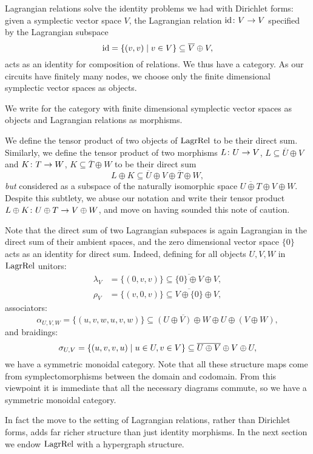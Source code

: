 Lagrangian relations solve the identity problems we had with Dirichlet forms:
given a symplectic vector space $V$, the Lagrangian relation $\mathrm{id}{\colon} V \to V$
specified by the Lagrangian subspace
\[
  \mathrm{id} = \{(v,v) \mid v \in V\} \subseteq \overline{V} \oplus V,
\]
acts as an identity for composition of relations. We thus have a category. As
our circuits have finitely many nodes, we choose only the finite dimensional
symplectic vector spaces as objects.

\begin{definition}
  We write  for the category with finite dimensional
  symplectic vector spaces as objects and Lagrangian relations as morphisms. 
\end{definition}

We define the tensor product of two objects of $\mathrm{LagrRel}$ to be their
direct sum. Similarly, we define the tensor product of two morphisms $L{\colon} U
\to V$, $L \subseteq \overline{U}\oplus V$ and $K{\colon} T \to W$, $K \subseteq
\overline{T} \oplus W$ to be their direct sum
\[
  L \oplus K \subseteq \overline{U}\oplus V \oplus\overline{T} \oplus W,
\]
\emph{but} considered as a subspace of the naturally isomorphic space
$\overline{U \oplus T} \oplus V \oplus W$.  Despite this subtlety, we abuse our
notation and write their tensor product $L \oplus K{\colon} U \oplus T \to V \oplus
W$, and move on having sounded this note of caution. 

Note that the direct sum of two Lagrangian subspaces is
again Lagrangian in the direct sum of their ambient spaces, and the zero
dimensional vector space $\{0\}$ acts as an identity for direct sum. Indeed,
defining for all objects $U,V,W$ in $\mathrm{LagrRel}$ unitors: 
\begin{align*}
  \lambda_V &= \{(0,v,v)\} \subseteq \overline{\{0\} \oplus V} \oplus V, \\
  \rho_V &= \{(v,0,v)\} \subseteq \overline{V \oplus \{0\}} \oplus V,
\end{align*}
associators:
\[
  \alpha_{U,V,W}= \{(u,v,w,u,v,w)\} \subseteq \overline{(U \oplus V)\oplus W}
  \oplus U \oplus (V \oplus W),
\]
and braidings:
\[
  \sigma_{U,V} = \{(u,v,v,u) \mid u \in U, v \in V\} \subseteq \overline{U \oplus V}
  \oplus V \oplus U,
\]
we have a symmetric monoidal category.  Note that all these structure
maps come from symplectomorphisms between the domain and codomain. From this
viewpoint it is immediate that all the necessary diagrams commute, so we
have a symmetric monoidal category. 

In fact the move to the setting of Lagrangian relations, rather than Dirichlet
forms, adds far richer structure than just identity morphisms. In the next
section we endow $\mathrm{LagrRel}$ with a hypergraph structure.

